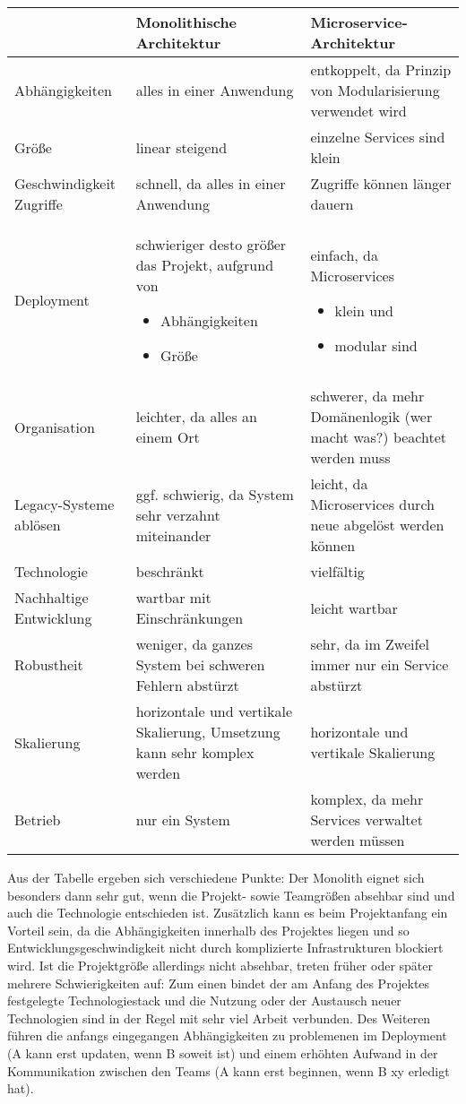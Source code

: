 \begin{center}
	\begin{tabular}{p{5cm}p{5cm}p{5cm}}
		& Monolithische Architektur & Microservice-Architektur \\ \hline
		Abhängigkeiten & alles in einer Anwendung & entkoppelt, da Prinzip von Modularisierung verwendet wird \\
		Größe & linear steigend & einzelne Services sind klein \\
		Geschwindigkeit Zugriffe & schnell, da alles in einer Anwendung & Zugriffe können länger dauern \\ 
		Deployment & schwieriger desto größer das Projekt, aufgrund von
		\begin{itemize}
			\item Abhängigkeiten  
			\item Größe \end{itemize}
		 & einfach, da Microservices \begin{itemize}
			\item klein und 
		    \item modular sind \end{itemize} \\
		Organisation & leichter, da alles an einem Ort & schwerer, da mehr Domänenlogik (wer macht was?) beachtet werden muss \\
		Legacy-Systeme ablösen & ggf. schwierig, da System sehr verzahnt miteinander & leicht, da Microservices durch neue abgelöst werden können \\
		Technologie & beschränkt & vielfältig \\
		Nachhaltige Entwicklung & wartbar mit Einschränkungen & leicht wartbar \\
		Robustheit & weniger, da ganzes System bei schweren Fehlern abstürzt & sehr, da im Zweifel immer nur ein Service abstürzt \\
		Skalierung & horizontale und vertikale Skalierung, Umsetzung kann sehr komplex werden &  horizontale und vertikale Skalierung \\
		Betrieb & nur ein System & komplex, da mehr Services verwaltet werden müssen
	\end{tabular}
\end{center}


Aus der Tabelle ergeben sich verschiedene Punkte: Der Monolith eignet sich besonders dann sehr gut, wenn die Projekt- sowie Teamgrößen absehbar sind und auch die Technologie entschieden ist. Zusätzlich kann es beim Projektanfang ein Vorteil sein, da die Abhängigkeiten innerhalb des Projektes liegen und so Entwicklungsgeschwindigkeit nicht durch komplizierte Infrastrukturen blockiert wird. 
Ist die Projektgröße allerdings nicht absehbar, treten früher oder später mehrere Schwierigkeiten auf: Zum einen bindet der am Anfang des Projektes festgelegte Technologiestack und die Nutzung oder der Austausch neuer Technologien sind in der Regel mit sehr viel Arbeit verbunden. Des Weiteren führen die anfangs eingegangen Abhängigkeiten zu problemenen im Deployment (A kann erst updaten, wenn B soweit ist) und einem erhöhten Aufwand in der Kommunikation zwischen den Teams (A kann erst beginnen, wenn B xy erledigt hat). \\

